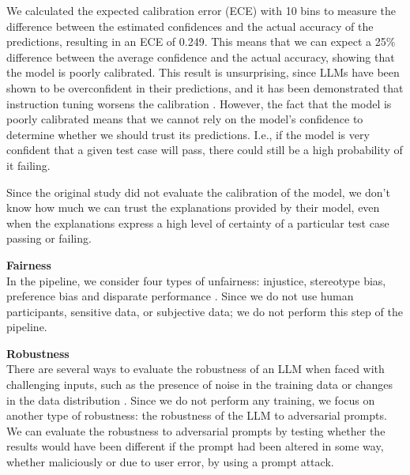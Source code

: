 \documentclass[a4paper]{article}
\begin{document}
We calculated the expected calibration error (ECE) with 10 bins to measure the difference between the estimated confidences and the actual accuracy of the predictions, resulting in an ECE of 0.249. This means that we can expect a 25\% difference between the average confidence and the actual accuracy, showing that the model is poorly calibrated. This result is unsurprising, since LLMs have been shown to be overconfident in their predictions, and it has been demonstrated that instruction tuning worsens the calibration \cite{zhu2023calibration}. However, the fact that the model is poorly calibrated means that we cannot rely on the model's confidence to determine whether we should trust its predictions. I.e., if the model is very confident that a given test case will pass, there could still be a high probability of it failing.

Since the original study did not evaluate the calibration of the model, we don't know how much we can trust the explanations provided by their model, even when the explanations express a high level of certainty of a particular test case passing or failing.

\textbf{Fairness}\\
In the pipeline, we consider four types of unfairness: injustice, stereotype bias, preference bias and disparate performance \cite{liu2024}. Since we do not use human participants, sensitive data, or subjective data; we do not perform this step of the pipeline.

\textbf{Robustness}\\
There are several ways to evaluate the robustness of an LLM when faced with challenging inputs, such as the presence of noise in the training data or changes in the data distribution \cite{chang2023}. Since we do not perform any training, we focus on another type of robustness: the robustness of the LLM to adversarial prompts. We can evaluate the robustness to adversarial prompts by testing whether the results would have been different if the prompt had been altered in some way, whether maliciously or due to user error, by using a prompt attack. 
\end{document}
